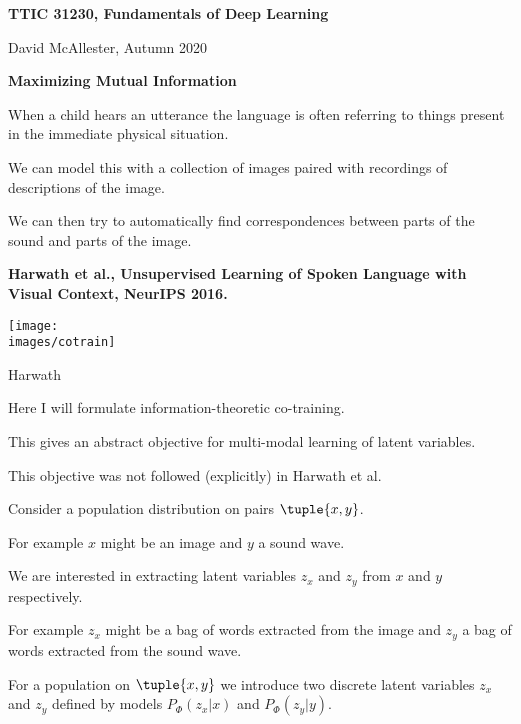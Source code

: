





{\Huge
  \centerline{\bf TTIC 31230,  Fundamentals of Deep Learning}
  \vfill
  \centerline{David McAllester, Autumn   2020}
  \vfill
  \centerline{\bf Maximizing Mutual Information}
  \vfill
  \vfill



When a child hears an utterance the language is often referring to things present in the immediate physical situation.

\vfill
We can model this with a collection of images paired with recordings of descriptions of the image.

\vfill
We can then try to automatically find correspondences between parts of the sound and parts of the image.

\vfill
{\bf Harwath et al., Unsupervised Learning of Spoken Language with Visual Context, NeurIPS 2016.}


\centerline{\texttt{[image: \\images/cotrain]}}

\centerline{Harwath}



Here I will formulate information-theoretic co-training.

\vfill
This gives an abstract objective for multi-modal learning of latent variables.

\vfill
This objective was not followed (explicitly) in Harwath et al.


Consider a population distribution on pairs $\tuple{x,y}$.

\vfill
For example $x$ might be an image and $y$ a sound wave.

\vfill
We are interested in extracting latent variables $z_x$ and $z_y$ from $x$ and $y$ respectively.

\vfill
For example $z_x$ might be a bag of words extracted from the image and $z_y$ a bag of words extracted from the sound wave.



For a population on $\tuple{x,y}$ we introduce two discrete latent variables $z_x$ and $z_y$ defined by
models {\color{red} $P_\Phi(z_x|x)$} and {\color{red} $P_\Phi(z_y|y)$}.

}

